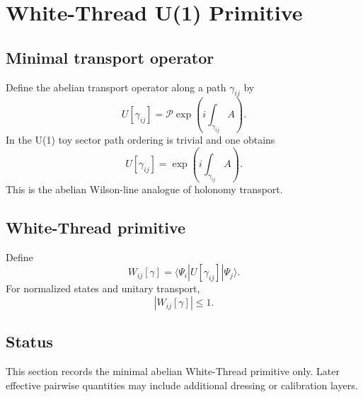 \section{White-Thread U(1) Primitive}
\label{sec:white-thread-primitive}

\subsection{Minimal transport operator}
Define the abelian transport operator along a path $\gamma_{ij}$ by
\begin{equation}
U[\gamma_{ij}] = \mathcal P\exp\!\left(i\int_{\gamma_{ij}} A\right).
\end{equation}
In the U(1) toy sector path ordering is trivial and one obtains
\begin{equation}
U[\gamma_{ij}] = \exp\!\left(i\int_{\gamma_{ij}} A\right).
\end{equation}
This is the abelian Wilson-line analogue of holonomy transport.

\subsection{White-Thread primitive}
Define
\begin{equation}
W_{ij}[\gamma] = \langle \Psi_i | U[\gamma_{ij}] | \Psi_j \rangle.
\end{equation}
For normalized states and unitary transport,
\begin{equation}
|W_{ij}[\gamma]|\le 1.
\end{equation}

\subsection{Status}
This section records the minimal abelian White-Thread primitive only. Later effective pairwise quantities may include additional dressing or calibration layers.
